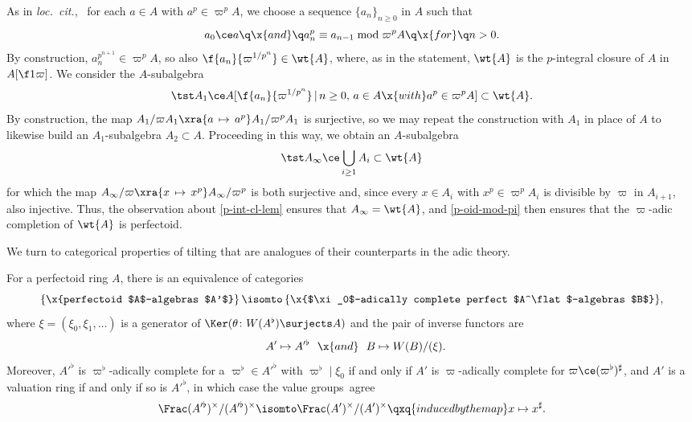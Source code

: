 \bpf
As in \emph{loc.~cit.},~
for each $a \in A$ with $a^p \in \varpi^pA$, we choose a sequence $\{a_n\}_{n \ge 0}$ in $A$ such that
\[
a_0 \ce a \q \x{and} \q a_n^p \equiv a_{n - 1} \bmod \varpi^pA \q \x{for} \q n > 0.
\]
By construction, $a_n^{p^{n + 1}} \in \varpi^pA$, so also $\f{a_n}{\varpi^{1/p^{n}}} \in \wt{A}$, %
where, as in the statement, $\wt{A}$ is the $p$-integral closure of $A$ in $A[\f1\varpi]$. We consider the $A$-subalgebra
\[
\tst A_1 \ce A[\f{a_n}{\varpi^{1/p^{n}}}\, \vert \, n \ge 0,\, a \in A \x{ with } a^p \in \varpi^pA] \subset \wt{A}.
\]
By construction, the map $A_1/\varpi A_1 \xra{a\,\mapsto\, a^p} A_1/\varpi^pA_1$ is surjective, so we may repeat the construction with $A_1$ in place of $A$ to likewise build an $A_1$-subalgebra $A_2 \subset A$. Proceeding in this way, we obtain an $A$-subalgebra
\[
\tst A_\infty \ce \bigcup_{i \ge 1} A_i  \subset \wt{A}
\]
for which the map $A_\infty/\varpi \xra{x\, \mapsto\, x^p} A_\infty/\varpi^p$ is both surjective and, since every $x \in A_i$ with $x^p \in \varpi^pA_i$ is divisible by $\varpi$ in $A_{i + 1}$, also injective. Thus, the observation about \eqref{p-int-cl-lem} ensures that $A_\infty = \wt{A}$, %
and \eqref{p-oid-mod-pi} then ensures that the $\varpi$-adic completion of $\wt{A}$ is perfectoid.
\epf











We turn to categorical properties of tilting that are analogues of their counterparts in the adic theory. %

\bprop \label{tilt-summary}
For a perfectoid ring $A$, there is an equivalence of categories
\[
\left\{\x{perfectoid $A$-algebras $A'$} \right\} \isomto \left\{\x{$\xi_0$-adically complete perfect $A^\flat$-algebras $B$} \right\}\!,
\]
where $\xi = (\xi_0, \xi_1, \dotsc )$ is a generator of $\Ker(\theta \colon  W(A^\flat) \surjects A)$ and the pair of inverse functors are
\[
\ \ A' \mapsto A'^\flat \ \ \x{and}\ \  B \mapsto W(B)/(\xi).
\]
Moreover, $A'^\flat$ is $\varpi^\flat$-adically complete for a $\varpi^\flat \in A'^\flat$ with $\varpi^\flat \mid \xi_0$ if and only if $A'$ is $\varpi$-adically complete for $\varpi \ce (\varpi^\flat)^\sharp$, and
 $A'$ is a valuation ring  if and only if so is $A'^\flat$, in which case the value groups~agree\ucolon
\[
\Frac(A'^\flat)^\times/(A'^\flat)^\times \isomto \Frac(A')^\times/(A')^\times \qxq{induced by the map} x \mapsto x^\sharp.
\]
\eprop

